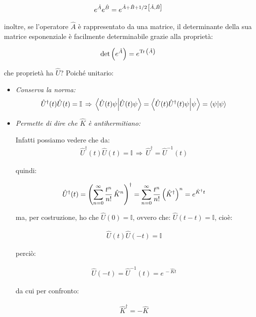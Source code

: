 \begin{align*}
	e^{\hat{A}}e^{\hat{B}} = e^{\hat{A} + \hat{B} + 1/2 \, \qty[\hat{A}, \hat{B}]}
\end{align*}
	
	inoltre, se l'operatore $\hat{A}$ è rappresentato da una matrice, il determinante della sua matrice esponenziale è facilmente determinabile grazie alla proprietà:
	
\begin{align*}
	\det\qty(e^{\hat{A}}) = e^{\Tr\qty(\hat{A})}
\end{align*}

	che proprietà ha $\hat{U}$? Poiché unitario:
	
\begin{itemize}

	\item \textit{Conserva la norma:}
	\begin{align*}
		\hat{U}^{\dagger}(t)\hat{U}(t) = \mathbb{I} \, \Rightarrow \, \braket{\hat{U}(t)\psi}{\hat{U}(t)\psi} = \braket{\hat{U}(t)\hat{U}^{\dagger}(t)\psi}{\psi} = \braket{\psi}
	\end{align*}
	
	\item \textit{Permette di dire che $\hat{K}$ è antihermitiano:}
	
		Infatti possiamo vedere che da:
	\begin{align*}
		\hat{U}^{\dagger}(t)\hat{U}(t) = \mathbb{I} \, \Rightarrow \, \hat{U}^{\dagger} = \hat{U}^{-1}(t)
	\end{align*}
	
		quindi:
		
	\begin{align*}
		\hat{U}^{\dagger}(t) = \qty(\sum_{n = 0}^{\infty} \frac{t^n}{n!} \, \hat{K}^n)^{\dagger} = \sum_{n=0}^{\infty} \frac{t^n}{n!} \, \qty(\hat{K}^{\dagger})^n = e^{\hat{K}^{\dagger} t}
	\end{align*}
	
		ma, per costruzione, ho che $\hat{U}(0) = \mathbb{I}$, ovvero che: $\hat{U}(t-t) = \mathbb{I}$, cioè: 
	
	\begin{align*}
		\hat{U}(t)\hat{U}(-t) = \mathbb{I}
	\end{align*}
	
		perciò:
	
	\begin{align*}
		\hat{U}(-t) = \hat{U}^{-1}(t) = e^{\, -\hat{K}t}
	\end{align*}
	
		da cui per confronto:
		
	\begin{align*}
		\hat{K}^{\dagger} = - \hat{K}
	\end{align*}

\end{itemize}

